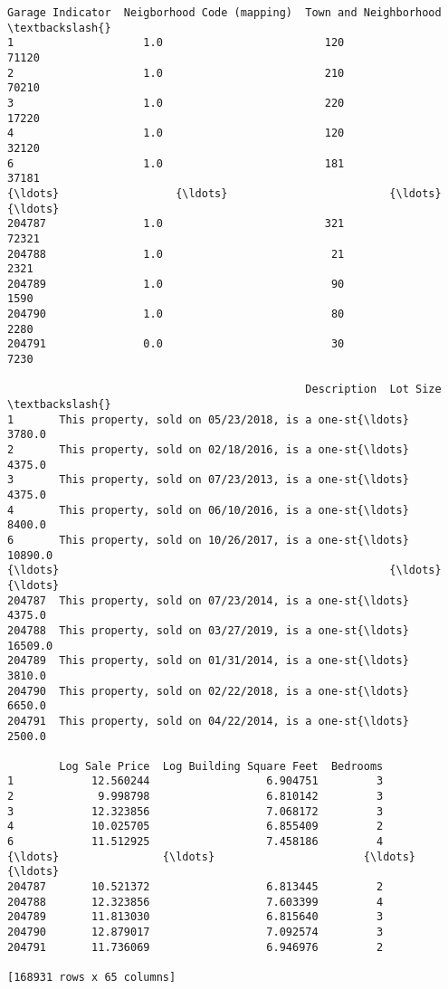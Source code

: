 \documentclass[11pt]{article}
\begin{document}
\begin{tcolorbox}[breakable, size=fbox, boxrule=.5pt, pad at break*=1mm, opacityfill=0]
\begin{Verbatim}[commandchars=\\\{\}]
        Garage Indicator  Neigborhood Code (mapping)  Town and Neighborhood  \textbackslash{}
1                    1.0                         120                  71120
2                    1.0                         210                  70210
3                    1.0                         220                  17220
4                    1.0                         120                  32120
6                    1.0                         181                  37181
{\ldots}                  {\ldots}                         {\ldots}                    {\ldots}
204787               1.0                         321                  72321
204788               1.0                          21                   2321
204789               1.0                          90                   1590
204790               1.0                          80                   2280
204791               0.0                          30                   7230

                                              Description  Lot Size  \textbackslash{}
1       This property, sold on 05/23/2018, is a one-st{\ldots}    3780.0
2       This property, sold on 02/18/2016, is a one-st{\ldots}    4375.0
3       This property, sold on 07/23/2013, is a one-st{\ldots}    4375.0
4       This property, sold on 06/10/2016, is a one-st{\ldots}    8400.0
6       This property, sold on 10/26/2017, is a one-st{\ldots}   10890.0
{\ldots}                                                   {\ldots}       {\ldots}
204787  This property, sold on 07/23/2014, is a one-st{\ldots}    4375.0
204788  This property, sold on 03/27/2019, is a one-st{\ldots}   16509.0
204789  This property, sold on 01/31/2014, is a one-st{\ldots}    3810.0
204790  This property, sold on 02/22/2018, is a one-st{\ldots}    6650.0
204791  This property, sold on 04/22/2014, is a one-st{\ldots}    2500.0

        Log Sale Price  Log Building Square Feet  Bedrooms
1            12.560244                  6.904751         3
2             9.998798                  6.810142         3
3            12.323856                  7.068172         3
4            10.025705                  6.855409         2
6            11.512925                  7.458186         4
{\ldots}                {\ldots}                       {\ldots}       {\ldots}
204787       10.521372                  6.813445         2
204788       12.323856                  7.603399         4
204789       11.813030                  6.815640         3
204790       12.879017                  7.092574         3
204791       11.736069                  6.946976         2

[168931 rows x 65 columns]
\end{Verbatim}
\end{tcolorbox}
        
\end{document}
